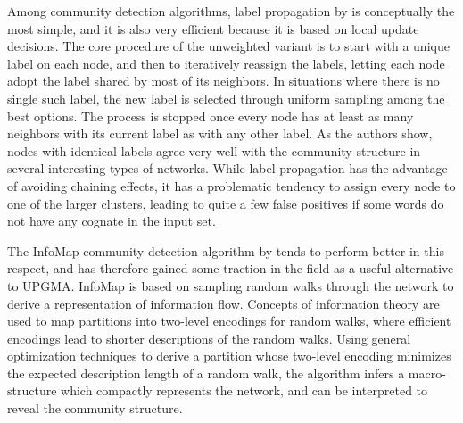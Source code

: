 Among community detection algorithms, label propagation by \cite{raghavan_ea_2007} is conceptually the most simple, and it is also very efficient because it is based on local update decisions. The core procedure of the unweighted variant is to start with a unique label on each node, and then to iteratively reassign the labels, letting each node adopt the label shared by most of its neighbors. In situations where there is no single such label, the new label is selected through uniform sampling among the best options. The process is stopped once every node has at least as many neighbors with its current label as with any other label. As the authors show, nodes with identical labels agree very well with the community structure in several interesting types of networks. While label propagation has the advantage of avoiding chaining effects, it has a problematic tendency to assign every node to one of the larger clusters, leading to quite a few false positives if some words do not
have any cognate in the input set.

The InfoMap community detection algorithm by \cite{rosvall_bergstrom_2008} tends to perform better in this respect, and has therefore gained some traction in the field as a useful alternative to UPGMA. InfoMap is based on sampling random walks through the network to derive a representation of information flow. Concepts of information theory are used to map partitions into two-level encodings for random walks, where efficient encodings lead to shorter descriptions of the random walks. Using general optimization techniques to derive a partition whose two-level encoding minimizes the expected description length of a random walk, the algorithm infers a macro-structure which compactly represents the network, and can be interpreted to reveal the community structure.

